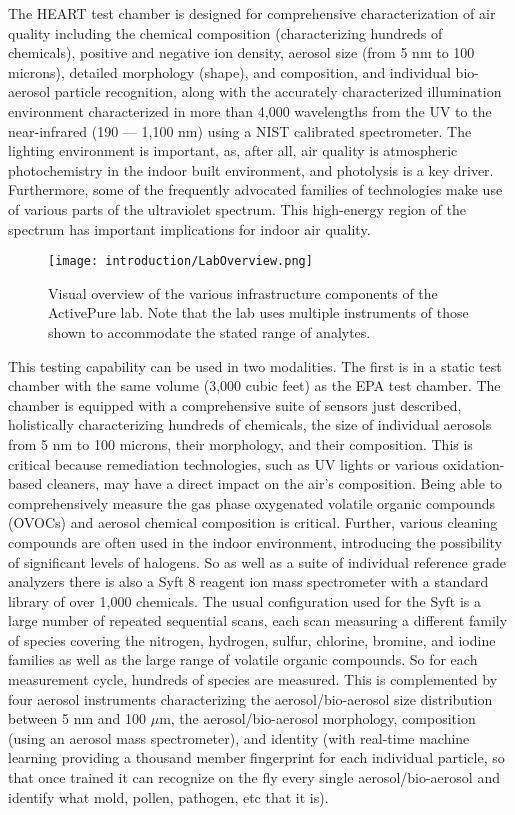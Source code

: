 The HEART test chamber is designed for comprehensive characterization of air quality including the chemical composition (characterizing hundreds of chemicals), positive and negative ion density, aerosol size (from 5 nm to 100 microns), detailed morphology (shape), and composition, and individual bio-aerosol particle recognition, along with the accurately characterized illumination environment characterized in more than 4,000 wavelengths from the UV to the near-infrared (190 — 1,100 nm) using a NIST calibrated spectrometer. The lighting environment is important, as, after all, air quality is atmospheric photochemistry in the indoor built environment, and photolysis is a key driver. Furthermore, some of the frequently advocated families of technologies make use of various parts of the ultraviolet spectrum. This high-energy region of the spectrum has important implications for indoor air quality.

\begin{figure}[h]
  \centering
  \texttt{[image: introduction/LabOverview.png]}
	\caption{Visual overview of the various infrastructure components of the ActivePure lab. Note that the lab uses multiple instruments of those shown to accommodate the stated range of analytes.}
	\label{Figure.InstrumentOverview}
\end{figure}


This testing capability can be used in two modalities. The first is in a static test chamber with the same volume (3,000 cubic feet) as the EPA test chamber. The chamber is equipped with a comprehensive suite of sensors just described, holistically characterizing hundreds of chemicals, the size of individual aerosols from 5 nm to 100 microns, their morphology, and their composition. This is critical because remediation technologies, such as UV lights or various oxidation-based cleaners, may have a direct impact on the air's composition. Being able to comprehensively measure the gas phase oxygenated volatile organic compounds (OVOCs) and aerosol chemical composition is critical. Further, various cleaning compounds are often used in the indoor environment, introducing the possibility of significant levels of halogens. So as well as a suite of individual reference grade analyzers there is also a Syft 8 reagent ion mass spectrometer with a standard library of over 1,000 chemicals. The usual configuration used for the Syft is a large number of repeated sequential scans, each scan measuring a different family of species covering the nitrogen, hydrogen, sulfur, chlorine, bromine, and iodine families as well as the large range of volatile organic compounds. So for each measurement cycle, hundreds of species are measured. This is complemented by four  aerosol instruments characterizing the aerosol/bio-aerosol size distribution between 5 nm and 100 $\mu$m, the aerosol/bio-aerosol morphology, composition (using an aerosol mass spectrometer), and identity (with real-time machine learning providing a thousand member fingerprint for each individual particle,  so that once trained it can recognize on the fly every single aerosol/bio-aerosol and identify what mold, pollen, pathogen, etc that it is).

